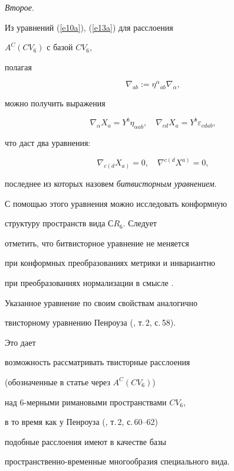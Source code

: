 {\it Второе}.


Из уравнений (\ref{e10a}), (\ref{e13a}) для расслоения


$A^C(CV_6)$ с базой $CV_6$,


полагая


$$




\nabla_{ab}:=\eta^\alpha{}_{ab}\nabla_\alpha,


$$


можно получить выражения


$$




\nabla_\alpha X_a=Y^b\eta_{\alpha ab},\quad


\nabla_{cd} X_a=Y^b\varepsilon_{cdab},


$$


что даст два уравнения:


$$




\nabla_{c\left(\right.d}X_{a\left.\right)}=0,\quad


\nabla^{c\left(\right.d}X^{a\left.\right)}=0,


$$


последнее из которых назовем {\it битвисторным уравнением}.


С помощью этого уравнения можно исследовать конформную


структуру пространств вида $СR_6$. Следует


отметить, что битвисторное уравнение не меняется


при конформных преобразованиях метрики и инвариантно


при преобразованиях нормализации в смысле \cite{1}.


Указанное уравнение по своим свойствам аналогично


твисторному уравнению Пенроуза (\cite{2}, т.\,2, с.\,58).


Это дает


возможность рассматривать твисторные расслоения


(обозначенные в статье через $A^C(CV_6)$)


над 6-мерными римановыми пространствами $CV_6$,


в то время как у Пенроуза (\cite{2}, т.\,2, с.\,60--62)


подобные расслоения имеют в качестве базы 


пространственно-временные многообразия специального вида.






